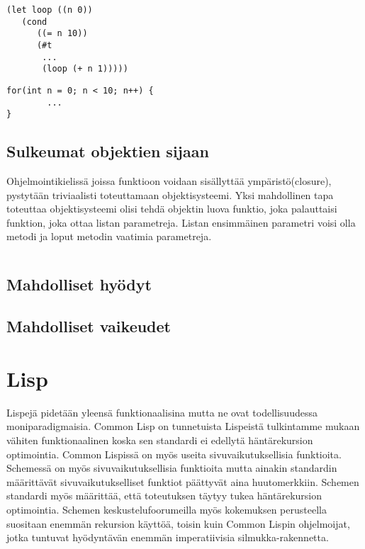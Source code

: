 \documentclass[12pt]{article}
\begin{document}
\begin{lstlisting}
(let loop ((n 0))
   (cond
      ((= n 10))
      (#t
       ...
       (loop (+ n 1)))))      
\end{lstlisting}
\begin{lstlisting}
for(int n = 0; n < 10; n++) {
        ...
}
\end{lstlisting}


\subsection{Sulkeumat objektien sijaan}
Ohjelmointikielissä joissa funktioon voidaan sisällyttää ympäristö(closure), pystytään triviaalisti toteuttamaan objektisysteemi.
Yksi mahdollinen tapa toteuttaa objektisysteemi olisi tehdä objektin luova funktio, joka palauttaisi funktion, joka ottaa listan parametreja.
Listan ensimmäinen parametri voisi olla metodi ja loput metodin vaatimia parametreja.
\begin{lstlisting}

\end{lstlisting}


\subsection{Mahdolliset hyödyt}
\subsection{Mahdolliset vaikeudet}

\section{Lisp}
Lispejä pidetään yleensä funktionaalisina mutta ne ovat todellisuudessa moniparadigmaisia. Common Lisp on tunnetuista Lispeistä tulkintamme mukaan vähiten funktionaalinen koska sen standardi ei edellytä häntärekursion optimointia. Common Lispissä on myös useita sivuvaikutuksellisia funktioita. Schemessä on myös sivuvaikutuksellisia funktioita mutta ainakin standardin määrittävät sivuvaikutukselliset funktiot päättyvät aina huutomerkkiin. Schemen standardi myös määrittää, että toteutuksen täytyy tukea häntärekursion optimointia. Schemen keskustelufoorumeilla myös kokemuksen perusteella suositaan enemmän rekursion käyttöä, toisin kuin Common Lispin ohjelmoijat, jotka tuntuvat hyödyntävän enemmän imperatiivisia silmukka-rakennetta.
\end{document}
